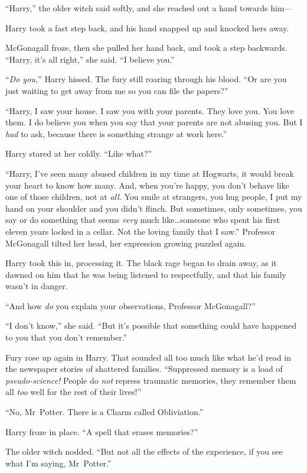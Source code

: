 “Harry,” the older witch said softly, and she reached out a hand towards him—

Harry took a fast step back, and his hand snapped up and knocked hers away.

McGonagall froze, then she pulled her hand back, and took a step backwards. “Harry, it’s all right,” she said. “I believe you.”

“\emph{Do you,}” Harry hissed. The fury still roaring through his blood. “Or are you just waiting to get away from me so you can file the papers?”

“Harry, I saw your house. I saw you with your parents. They love you. You love them. I do believe you when you say that your parents are not abusing you. But I \emph{had} to ask, because there is something strange at work here.”

Harry stared at her coldly. “Like what?”

“Harry, I’ve seen many abused children in my time at Hogwarts, it would break your heart to know how many. And, when you’re happy, you don’t behave like one of those children, not at \emph{all}. You smile at strangers, you hug people, I put my hand on your shoulder and you didn’t flinch. But sometimes, only sometimes, you say or do something that seems \emph{very} much like…someone who spent his first eleven years locked in a cellar. Not the loving family that I saw.” Professor McGonagall tilted her head, her expression growing puzzled again.

Harry took this in, processing it. The black rage began to drain away, as it dawned on him that he was being listened to respectfully, and that his family wasn’t in danger.

“And how \emph{do} you explain your observations, Professor McGonagall?”

“I don’t know,” she said. “But it’s possible that something could have happened to you that you don’t remember.”

Fury rose up again in Harry. That sounded all too much like what he’d read in the newspaper stories of shattered families. “Suppressed memory is a load of \emph{pseudo-science!} People do \emph{not} repress traumatic memories, they remember them all \emph{too} well for the rest of their lives!”

“No, Mr~Potter. There is a Charm called Obliviation.”

Harry froze in place. “A spell that erases memories?”

The older witch nodded. “But not all the effects of the experience, if you see what I’m saying, Mr~Potter.”

